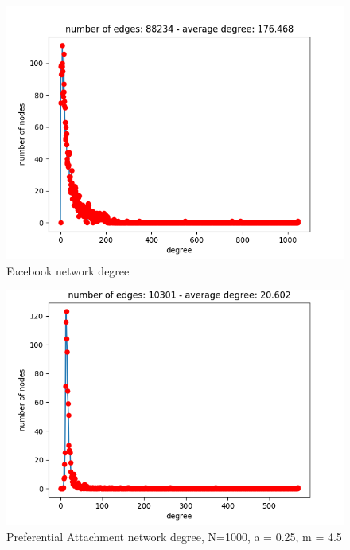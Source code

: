     \begin{figure}[t]
        \centering
        \includegraphics[width=\linewidth]{Figure/Degree_Histogram_Facebook.png}
        \caption{Facebook network degree}
        \label{fig:FacebookDegree}
    \end{figure}
    
    \begin{figure}[t]
        \centering
        \includegraphics[width=\linewidth]{Figure/Degree_Histogram_PrefAttach.png}
        \caption{Preferential Attachment network degree, N=1000, a = 0.25, m = 4.5}
        \label{fig:PrefAttachDegree}
    \end{figure}
    

